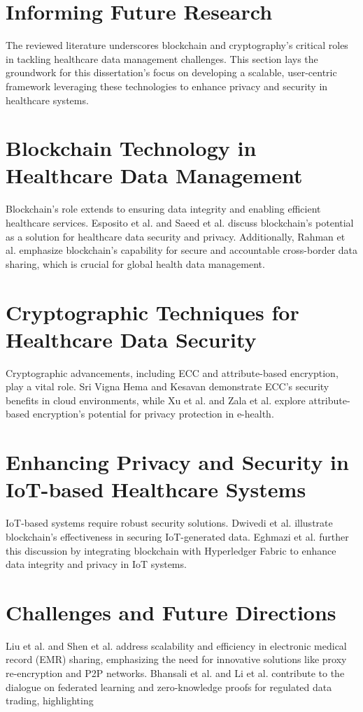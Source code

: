 \documentclass[cic,tc,english]{iiufrgs}
\begin{document}
\section{Informing Future Research}
The reviewed literature underscores blockchain and cryptography's critical roles in tackling healthcare data management challenges. This section lays the groundwork for this dissertation's focus on developing a scalable, user-centric framework leveraging these technologies to enhance privacy and security in healthcare systems.

\section{Blockchain Technology in Healthcare Data Management}
Blockchain's role extends to ensuring data integrity and enabling efficient healthcare services. Esposito et al. \cite{Esposito2018} and Saeed et al. \cite{Saeed2022} discuss blockchain's potential as a solution for healthcare data security and privacy. Additionally, Rahman et al. \cite{Rahman2020} emphasize blockchain's capability for secure and accountable cross-border data sharing, which is crucial for global health data management.

\section{Cryptographic Techniques for Healthcare Data Security}
Cryptographic advancements, including ECC and attribute-based encryption, play a vital role. Sri Vigna Hema and Kesavan \cite{sri2019} demonstrate ECC's security benefits in cloud environments, while Xu et al. \cite{XuJie2019} and Zala et al. \cite{Zala2024} explore attribute-based encryption's potential for privacy protection in e-health.

\section{Enhancing Privacy and Security in IoT-based Healthcare Systems}
IoT-based systems require robust security solutions. Dwivedi et al. \cite{Dwivedi2019} illustrate blockchain's effectiveness in securing IoT-generated data. Eghmazi et al. \cite{Eghmazi2024} further this discussion by integrating blockchain with Hyperledger Fabric to enhance data integrity and privacy in IoT systems.

\section{Challenges and Future Directions}
Liu et al. \cite{Liu2024} and Shen et al. \cite{Shen2019} address scalability and efficiency in electronic medical record (EMR) sharing, emphasizing the need for innovative solutions like proxy re-encryption and P2P networks. Bhansali et al. \cite{Bhansali2022} and Li et al. \cite{Li2024} contribute to the dialogue on federated learning and zero-knowledge proofs for regulated data trading, highlighting 
\end{document}
